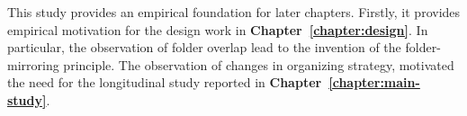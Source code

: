 This study provides an empirical foundation for later chapters. Firstly, it provides empirical motivation for the design work in \textbf{Chapter~\ref{chapter:design}}.  In particular, the observation of folder overlap lead to the invention of the folder-mirroring principle. %
The observation of changes in organizing strategy, motivated the need for the longitudinal study reported in \textbf{Chapter~\ref{chapter:main-study}}. %









